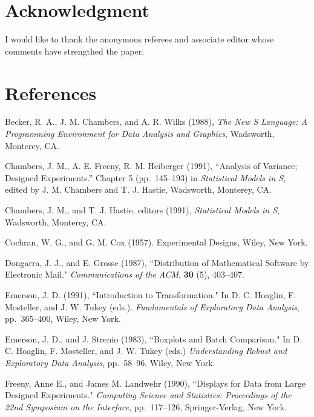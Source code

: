 \section*{Acknowledgment}
I would like to thank the anonymous
referees and associate editor whose comments have strengthed the paper.

\section*{References}
\label{sec-ref}
\begin{description}

\item Becker, R. A., J. M. Chambers, and A. R. Wilks (1988),
{\em The New S Language: A Programming Environment for Data
Analysis and Graphics}, Wadsworth, Monterey, CA.

\item Chambers, J. M., A. E. Freeny, R. M. Heiberger (1991),
``Analysis of Variance; Designed Experiments.''  Chapter 5 (pp.~145--193) in
{\em Statistical Models in S}, edited by J. M. Chambers and T. J. Hastie,
Wadsworth, Monterey, CA.

\item Chambers, J. M., and T. J. Hastie, editors (1991),
{\em Statistical Models in S}, Wadsworth, Monterey, CA.

\item Cochran, W. G., and G. M. Cox (1957). {Experimental Designs}, Wiley, New
York.

\item
Dongarra, J. J., and E. Grosse (1987), ``Distribution of
Mathematical Software by Electronic Mail."  {\em Communications
of the ACM}, {\bf 30} (5), 403--407.

\item Emerson, J. D. (1991), ``Introduction to Transformation."
In D. C. Hoaglin, F. Mosteller, and J. W. Tukey (eds.).  {\it
Fundamentals of Exploratory Data Analysis}, pp.~365--400, Wiley,
New York.

\item Emerson, J. D., and J. Strenio (1983), ``Boxplots and Batch Comparison."
In D. C. Hoaglin, F. Mosteller, and J. W. Tukey (eds.) {\it Understanding
Robust and Exploratory Data Analysis}, pp.~58--96, Wiley, New York.

\item Freeny, Anne E., and James M.  Landwehr (1990), ``Displays for Data from
Large Designed Experiments." {\it Computing Science and Statistics:
Proceedings of the 22nd Symposium on the Interface}, pp.~117--126,
Springer-Verlag, New York.


\end{description}
